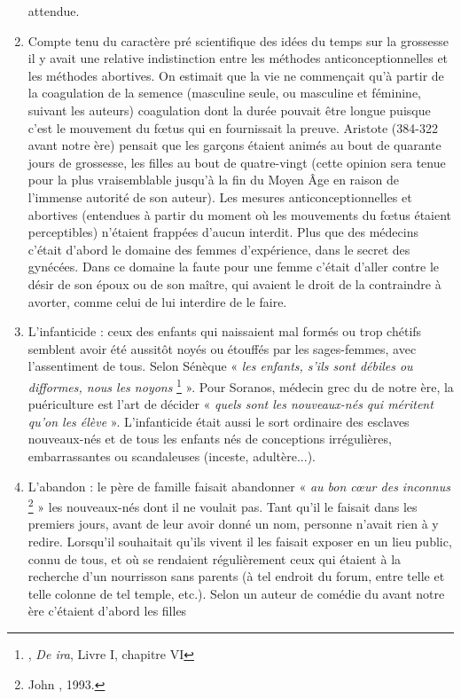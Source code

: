 \begin{enumerate}
attendue.
\item Compte tenu du caractère pré scientifique des idées du temps
sur la grossesse il y avait une relative indistinction entre les méthodes anticonceptionnelles
et les méthodes abortives. On estimait que la vie ne
commençait qu'à partir de la coagulation de la semence (masculine seule,
ou masculine et féminine, suivant les auteurs) coagulation dont la durée
pouvait être longue puisque c'est le mouvement du fœtus qui en fournissait
la preuve. Aristote (384-322 avant notre ère) pensait que les garçons
étaient animés au bout de quarante jours de grossesse, les filles au bout
de quatre-vingt (cette opinion sera tenue pour la plus vraisemblable jusqu'à
la fin du Moyen Âge en raison de l'immense autorité de son auteur).
Les mesures anticonceptionnelles et abortives (entendues à partir du
moment où les mouvements du fœtus étaient perceptibles) n'étaient
frappées d'aucun interdit. Plus que des médecins c'était d'abord le domaine
des femmes d'expérience, dans le secret des gynécées. Dans ce
domaine la faute pour une femme c'était d'aller contre le désir de son
époux ou de son maître, qui avaient le droit de la contraindre à avorter,
comme celui de lui interdire de le faire.
\item L'infanticide : ceux des enfants qui naissaient mal formés ou
trop chétifs sem\-blent avoir été aussitôt noyés ou étouffés par les sages-femmes,
avec l'assentiment de tous. Selon Sénèque « \emph{les enfants, s'ils sont
débiles ou difformes, nous les noyons}%
\footnote{, \emph{De ira}, Livre I, chapitre VI} ».
Pour Soranos, médecin grec du
 de notre ère, la puériculture est l'art de décider « \emph{quels sont les
nouveaux-nés qui méritent qu'on les élève} ». L'infanticide était aussi le sort ordinaire
des esclaves nouveaux-nés et de tous les enfants nés de conceptions
irrégulières, embarrassantes ou scandaleuses (inceste, adultère...).
\item L'abandon : le père de famille faisait abandonner « \emph{au bon cœur
des inconnus}%
\footnote{John , 1993.} »
les nouveaux-nés dont il ne voulait pas. Tant qu'il le faisait
dans les premiers jours, avant de leur avoir donné un nom, personne
n'avait rien à y redire. Lorsqu'il souhaitait qu'ils vivent il les faisait exposer
en un lieu public, connu de tous, et où se rendaient régulièrement
ceux qui étaient à la recherche d'un nourrisson sans parents (à tel endroit
du forum, entre telle et telle colonne de tel temple, etc.). Selon un auteur
de comédie du  avant notre ère c'étaient d'abord les filles

\end{enumerate}

